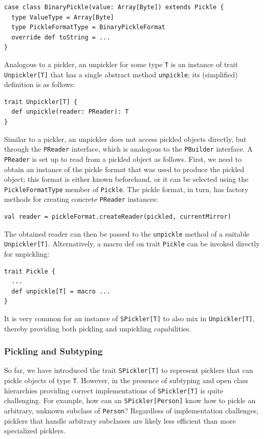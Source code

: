 \documentclass[10pt]{sigplanconf}
\theoremstyle{definition}
\theoremstyle{definition}
\begin{document}
\begin{lstlisting}
case class BinaryPickle(value: Array[Byte]) extends Pickle {
  type ValueType = Array[Byte]
  type PickleFormatType = BinaryPickleFormat
  override def toString = ...
}
\end{lstlisting}
\noindent


Analogous to a pickler, an unpickler for some type \verb|T| is an instance of
trait \verb|Unpickler[T]| that has a single abstract method \verb|unpickle|;
its (simplified) definition is as follows:

\begin{lstlisting}
trait Unpickler[T] {
  def unpickle(reader: PReader): T
}
\end{lstlisting}
\noindent

Similar to a pickler, an unpickler does not access pickled objects directly,
but through the \verb|PReader| interface, which is analogous to the
\verb|PBuilder| interface. A \verb|PReader| is set up to read from a pickled
object as follows. First, we need to obtain an instance of the pickle format
that was used to produce the pickled object; this format is either known
beforehand, or it can be selected using the \verb|PickleFormatType| member of
\verb|Pickle|. The pickle format, in turn, has factory methods for creating
concrete \verb|PReader| instances:

\begin{lstlisting}
val reader = pickleFormat.createReader(pickled, currentMirror)
\end{lstlisting}

The obtained reader can then be passed to the \verb|unpickle| method of a
suitable \verb|Unpickler[T]|. Alternatively, a macro def on trait
\verb|Pickle| can be invoked directly for unpickling:

\begin{lstlisting}
trait Pickle {
  ...
  def unpickle[T] = macro ...
}
\end{lstlisting}
\noindent
It is very common for an instance of \verb|SPickler[T]| to also mix in
\verb|Unpickler[T]|, thereby providing both pickling and unpickling
capabilities.


\subsubsection{Pickling and Subtyping}

So far, we have introduced the trait \verb|SPickler[T]| to represent picklers
that can pickle objects of type \verb|T|. However, in the presence of
subtyping and open class hierarchies providing correct implementations of
\verb|SPickler[T]| is quite challenging. For example, how can an
\verb|SPickler[Person]| know how to pickle an arbitrary, unknown subclass of
\verb|Person|? Regardless of implementation challenges, picklers that handle
arbitrary subclasses are likely less efficient than more specialized picklers.
\end{document}
